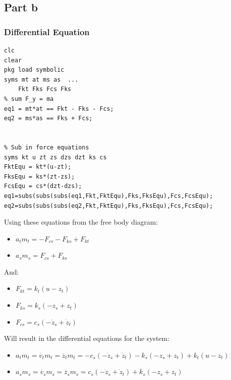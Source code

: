 \documentclass[11pt]{article}
\begin{document}
\subsection{Part b}
\label{sec:orgb61511b}
\subsubsection{Differential Equation}
\label{sec:orgfba282b}
\begin{verbatim}
clc
clear
pkg load symbolic
syms mt at ms as  ...
    Fkt Fks Fcs Fks
% sum F_y = ma
eq1 = mt*at == Fkt - Fks - Fcs;
eq2 = ms*as == Fks + Fcs;


% Sub in force equations
syms kt u zt zs dzs dzt ks cs
FktEqu = kt*(u-zt);
FksEqu = ks*(zt-zs);
FcsEqu = cs*(dzt-dzs);
eq1=subs(subs(subs(eq1,Fkt,FktEqu),Fks,FksEqu),Fcs,FcsEqu);
eq2=subs(subs(subs(eq2,Fkt,FktEqu),Fks,FksEqu),Fcs,FcsEqu);
\end{verbatim}



Using these equations from the free body diagram:
\begin{itemize}
\item \(a_t m_t = - F_{cs} - F_{ks} + F_{kt}\)
\item \(a_s m_s = F_{cs} + F_{ks}\)
\end{itemize}
And:
\begin{itemize}
\item \(F_{kt} = k_t \left(u - z_t\right)\)
\item \(F_{ks} = k_s \left(- z_s + z_t\right)\)
\item \(F_{cs} = c_s \left(- \dot{z}_s + \dot{z}_t\right)\)
\end{itemize}
Will result in the differential equations for the system:
\begin{itemize}
\item \(a_t m_t = \dot{v_t} m_t = \ddot{z_t} m_t = -c_s \left(- \dot{z}_s + \dot{z}_t\right) - k_s \left(- z_s + z_t\right) + k_t \left(u - z_t\right)\)
\item \(a_s m_s = \dot{v_s} m_s = \ddot{z_s} m_s =  c_s \left(- \dot{z}_s + \dot{z}_t\right) + k_s \left(- z_s + z_t\right)\)
\end{itemize}
\end{document}
